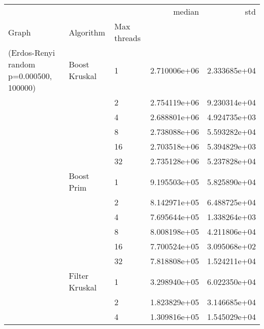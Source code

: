 \begin{tabular}{lllrr}
\toprule
                                                       &                     &    &        median &           std \\
Graph & Algorithm & Max threads &               &               \\
\midrule
(Erdos-Renyi random p=0.000500, 100000) & Boost Kruskal & 1  &  2.710006e+06 &  2.333685e+04 \\
                                                       &                     & 2  &  2.754119e+06 &  9.230314e+04 \\
                                                       &                     & 4  &  2.688801e+06 &  4.924735e+03 \\
                                                       &                     & 8  &  2.738088e+06 &  5.593282e+04 \\
                                                       &                     & 16 &  2.703518e+06 &  5.394829e+03 \\
                                                       &                     & 32 &  2.735128e+06 &  5.237828e+04 \\
                                                       & Boost Prim & 1  &  9.195503e+05 &  5.825890e+04 \\
                                                       &                     & 2  &  8.142971e+05 &  6.488725e+04 \\
                                                       &                     & 4  &  7.695644e+05 &  1.338264e+03 \\
                                                       &                     & 8  &  8.008198e+05 &  4.211806e+04 \\
                                                       &                     & 16 &  7.700524e+05 &  3.095068e+02 \\
                                                       &                     & 32 &  7.818808e+05 &  1.524211e+04 \\
                                                       & Filter Kruskal & 1  &  3.298940e+05 &  6.022350e+04 \\
                                                       &                     & 2  &  1.823829e+05 &  3.146685e+04 \\
                                                       &                     & 4  &  1.309816e+05 &  1.545029e+04 \\

\end{tabular}
